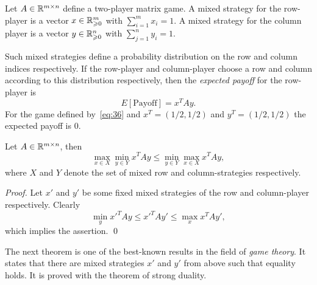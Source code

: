 \begin{definition}
  \label{def:m1}
  Let $A \in \mathbb{R}^{m\times n}$ define a two-player matrix game. A mixed
  strategy for the row-player is a vector $x \in \mathbb{R}_{\geqslant0}^m$ with
  $\sum_{i=1}^m x_i = 1$. A mixed strategy for the column player is a
  vector $y \in  \mathbb{R}_{\geqslant0}^n$ with $\sum_{j=1}^n y_i = 1$. 
\end{definition}
%
Such mixed strategies define a probability distribution on the row and
column indices respectively. If the row-player and column-player
choose a row and column according to this distribution respectively,
then the \emph{expected payoff} for the row-player is
\begin{equation}
  \label{eq:37}
  E[\text{Payoff}]=x^TAy. 
\end{equation}
%
For the game defined by~\eqref{eq:36} and $x^T=(1/2,1/2)$ and
$y^T=(1/2,1/2)$ the expected payoff is $0$. 

\begin{lemma}
  \label{d:lem:10}
  Let $A \in \mathbb{R}^{m\times n}$, then 
   \begin{displaymath}
   \max_{x \in X} \min_{y\in Y} x^TA y \leq \min_{y\in Y} \max_{x\in X}
   x^TAy,       
  \end{displaymath}
  where $X$ and $Y$ denote the set of mixed row and column-strategies
  respectively. 
\end{lemma}

\begin{proof}
  Let $x'$ and $y'$  be some fixed mixed strategies of the row and
  column-player  respectively. Clearly 
  \begin{displaymath}
    \min_y {x'}^T A y \leq {x'}^T A y' \leq \max_x {x}^T A y',
  \end{displaymath}
  which implies the assertion. \qed 
\end{proof}


The next theorem is one of the best-known results in the field of
\emph{game theory}. It states that there are mixed strategies $x'$ and
$y'$ from above such that equality holds. It is proved with the
theorem of strong duality. 

